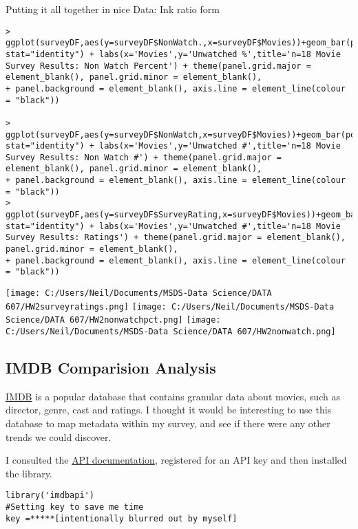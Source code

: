 \documentclass[
]{article}
\begin{document}
Putting it all together in nice Data: Ink ratio form

\begin{verbatim}
> ggplot(surveyDF,aes(y=surveyDF$NonWatch.,x=surveyDF$Movies))+geom_bar(position="dodge", stat="identity") + labs(x='Movies',y='Unwatched %',title='n=18 Movie Survey Results: Non Watch Percent') + theme(panel.grid.major = element_blank(), panel.grid.minor = element_blank(),
+ panel.background = element_blank(), axis.line = element_line(colour = "black"))

> ggplot(surveyDF,aes(y=surveyDF$NonWatch,x=surveyDF$Movies))+geom_bar(position="dodge", stat="identity") + labs(x='Movies',y='Unwatched #',title='n=18 Movie Survey Results: Non Watch #') + theme(panel.grid.major = element_blank(), panel.grid.minor = element_blank(),
+ panel.background = element_blank(), axis.line = element_line(colour = "black"))
> ggplot(surveyDF,aes(y=surveyDF$SurveyRating,x=surveyDF$Movies))+geom_bar(position="dodge", stat="identity") + labs(x='Movies',y='Unwatched #',title='n=18 Movie Survey Results: Ratings') + theme(panel.grid.major = element_blank(), panel.grid.minor = element_blank(),
+ panel.background = element_blank(), axis.line = element_line(colour = "black"))
\end{verbatim}

\texttt{[image: C:/Users/Neil/Documents/MSDS-Data Science/DATA 607/HW2surveyratings.png]}
\texttt{[image: C:/Users/Neil/Documents/MSDS-Data Science/DATA 607/HW2nonwatchpct.png]}
\texttt{[image: C:/Users/Neil/Documents/MSDS-Data Science/DATA 607/HW2nonwatch.png]}

\hypertarget{imdb-comparision-analysis}{%
\subsection{IMDB Comparision Analysis}\label{imdb-comparision-analysis}}

\href{https://www.imdb.com/?ref_=nv_home}{IMDB} is a popular database
that contains granular data about movies, such as director, genre, cast
and ratings. I thought it would be interesting to use this database to
map metadata within my survey, and see if there were any other trends we
could discover.

I consulted the
\href{https://cran.r-project.org/web/packages/imdbapi/index.html}{API
documentation}, registered for an API key and then installed the
library.

\begin{verbatim}
library('imdbapi')
#Setting key to save me time
key =*****[intentionally blurred out by myself]
\end{verbatim}
\end{document}

